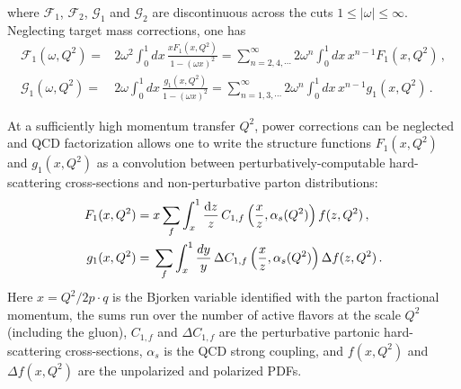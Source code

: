 where $\mathcal{F}_1$, $\mathcal{F}_2$, $\mathcal{G}_1$ and $\mathcal{G}_2$
are discontinuous across the cuts $1\leq |\omega| \leq \infty$.
%
Neglecting target mass corrections, one has
\begin{align}
\mathcal{F}_1(\omega,Q^2) 
= {} & 2 \omega^2 \int_0^1 dx\,  \frac{xF_1(x,Q^2)}{1-(\omega x)^2} 
= \sum_{n=2,4,\cdots}^\infty 2\omega^n \int_0^1 dx\, x^{n-1} F_1(x,Q^2) \,, \\
\mathcal{G}_1(\omega,Q^2) 
= {} & 2 \omega \int_0^1 dx\, \frac{g_1(x,Q^2)}{1-(\omega x)^2} 
= \sum_{n=1,3,\cdots}^\infty 2\omega^n \int_0^1 dx\, x^{n-1} g_1(x,Q^2)\,.
\end{align}

At a sufficiently high momentum transfer $Q^2$, power corrections can be 
neglected and QCD factorization allows one to write the structure functions 
$F_1(x,Q^2)$ and $g_1(x,Q^2)$ as a convolution between perturbatively-computable
hard-scattering cross-sections and non-perturbative parton distributions:
\begin{align}
F_1(x,Q^2) 
= {} 
& x\sum_f \int_x^1 \frac{{\rm d}z}{z}\,C_{1,f}\left(\frac{x}{z},\alpha_s(Q^2)\right)f(z,Q^2) \,, \label{eq:Fi}\\
g_1(x,Q^2) 
= {} 
& \sum_f \int_x^1\frac{dy}{y}\, \Delta C_{1,f}\left(\frac{x}{z},\alpha_s(Q^2)\right) \Delta f(z,Q^2) \,.
\label{pdf}
\end{align}
%
Here $x=Q^2/2p\cdot q$ is the Bjorken variable identified with the parton
fractional momentum, the sums run over the number of active
flavors at the scale $Q^2$ (including the gluon), $C_{1,f}$ and 
$\Delta C_{1,f}$ are the perturbative partonic hard-scattering cross-sections,
$\alpha_s$ is the QCD strong coupling, and $f(x,Q^2)$ and $\Delta f(x,Q^2)$ 
are the unpolarized and polarized PDFs.

